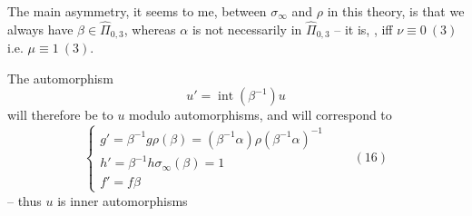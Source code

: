 The main asymmetry, it seems to me, between $\sigma_\infty$ and $\rho$ in this theory, is that  we always have $\beta\in\widehat{\Pi}_{0,3}$, whereas $\alpha$ is not necessarily in $\widehat{\Pi}_{0,3}$ -- it is, , iff $\nu\equiv0\ (3)$ i.e. $\mu\equiv1\ (3)$.

The automorphism
\[
u'=\operatorname{int}(\beta^{-1})u
\]
will therefore be  to $u$ modulo  automorphisms, and will correspond to
\[
\left\{\begin{array}{l}
g'=\beta^{-1}g\rho(\beta)=(\beta^{-1}\alpha)\rho(\beta^{-1}\alpha)^{-1}\\
h'=\beta^{-1}h\sigma_\infty(\beta)=1\\
f'=f\beta
\end{array}\right.
\qquad (16)
\]
-- thus $u$ is   inner automorphisms

